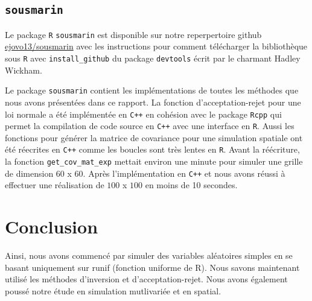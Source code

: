 \documentclass[10pt]{article} %
\begin{document}



\subsection{\texttt{sousmarin}}
Le package \texttt{R} \texttt{sousmarin} est disponible sur notre reperpertoire github \href{https://github.com/ejovo13/sousmarin}{ejovo13/sousmarin} avec les instructions pour comment télécharger la bibliothèque
sous \texttt{R} avec \texttt{install\_github} du package \texttt{devtools} écrit par le charmant Hadley Wickham.

Le package \texttt{sousmarin} contient les implémentations de toutes les méthodes que nous avons présentées dans ce rapport. La fonction d'acceptation-rejet pour une loi normale a été implémentée en \texttt{C++} en cohésion
avec le package \texttt{Rcpp} qui permet la compilation de code source en \texttt{C++} avec une interface en \texttt{R}. Aussi les fonctions pour générer la matrice de covariance pour une simulation
spatiale ont été réecrites en \texttt{C++} comme les boucles sont très lentes en \texttt{R}. Avant la réécriture, la fonction \texttt{get\_cov\_mat\_exp} mettait environ une minute pour simuler une grille
de dimension $60$ x $60$. Après l'implémentation en \texttt{C++} et nous avons réussi à effectuer une réalisation de $100$ x $100$ en moins de 10 secondes.

\section{Conclusion}

Ainsi, nous avons commencé par simuler des variables aléatoires simples en se basant uniquement sur runif (fonction uniforme de R). Nous savons maintenant utilisé les méthodes d'inversion et d'acceptation-rejet. Nous avons également poussé notre étude en simulation mutlivariée et en spatial.
\end{document}
